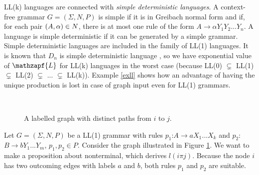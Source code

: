 LL(k) languages are connected with \textit{simple deterministic languages}. A context-free grammar $G = (\Sigma, N, P)$ is simple if it is in Greibach normal form and if, for each pair $(A, \alpha) \in N \time \Sigma$, there is at most one rule of the form $A \rightarrow \alpha Y_1 Y_2 ... Y_n$. A language is simple deterministic if it can be generated by a simple grammar. Simple deterministic languages are included in the family of LL(1) languages. It is known that $D_n$ is simple deterministic language \cite{SDet}, so we have exponential value of $\mathzapf{L}$ for LL(k) languages in the worst case (because LL(0) $\subsetneq$ LL(1)  $\subsetneq$ LL(2)  $\subsetneq$ ...  $\subsetneq$ LL(k)). Example \ref{exll} shows how an advantage of having the unique production is lost in case of graph input even for LL(1) grammars.
\begin{figure}
\\
	\caption{A labelled graph with distinct paths from $i$ to $j$.}
\label{graphll}
\end{figure}
\begin{example}
\label{exll}
Let $G = (\Sigma, N, P)$ be a LL(1) grammar with rules $p_1$:$A \rightarrow a X_1... X_k$ and $p_2:$$B \rightarrow b Y_1... Y_m$, $p_1, p_2 \in P$. Consider the graph illustrated in Figure \ref{graphll}. We want to make a proposition about nonterminal, which derives $l(i\pi j)$. Because the node $i$ has two outcoming edges with labels $a$ and $b$, both rules $p_1$ and $p_2$ are suitable.
\end{example}
